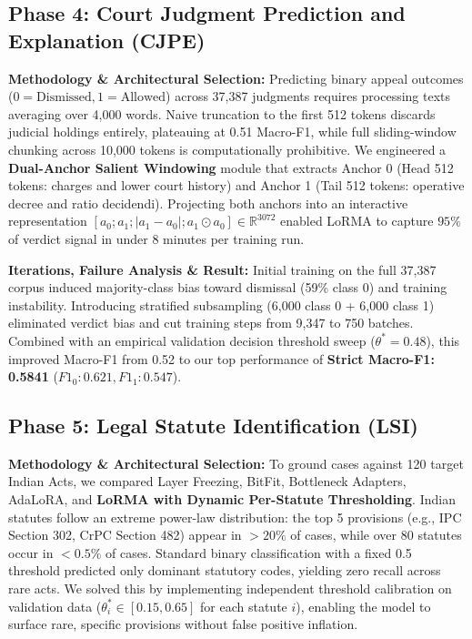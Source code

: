 \documentclass[11pt, oneside]{article}
\begin{document}
\subsection{Phase 4: Court Judgment Prediction and Explanation (CJPE)}
\noindent
\textbf{Methodology \& Architectural Selection:} Predicting binary appeal outcomes ($0 = \text{Dismissed}, 1 = \text{Allowed}$) across 37,387 judgments requires processing texts averaging over 4,000 words. Naive truncation to the first 512 tokens discards judicial holdings entirely, plateauing at 0.51 Macro-F1, while full sliding-window chunking across 10,000 tokens is computationally prohibitive. We engineered a \textbf{Dual-Anchor Salient Windowing} module that extracts Anchor 0 (Head 512 tokens: charges and lower court history) and Anchor 1 (Tail 512 tokens: operative decree and ratio decidendi). Projecting both anchors into an interactive representation $[a_0; a_1; |a_1 - a_0|; a_1 \odot a_0] \in \mathbb{R}^{3072}$ enabled LoRMA to capture $95\%$ of verdict signal in under 8 minutes per training run.

\medskip
\noindent
\textbf{Iterations, Failure Analysis \& Result:} Initial training on the full 37,387 corpus induced majority-class bias toward dismissal (59\% class 0) and training instability. Introducing stratified subsampling (6,000 class 0 + 6,000 class 1) eliminated verdict bias and cut training steps from 9,347 to 750 batches. Combined with an empirical validation decision threshold sweep ($\theta^* = 0.48$), this improved Macro-F1 from 0.52 to our top performance of \textbf{Strict Macro-F1: 0.5841} ($F1_0: 0.621, F1_1: 0.547$).

\subsection{Phase 5: Legal Statute Identification (LSI)}
\noindent
\textbf{Methodology \& Architectural Selection:} To ground cases against 120 target Indian Acts, we compared Layer Freezing, BitFit, Bottleneck Adapters, AdaLoRA, and \textbf{LoRMA with Dynamic Per-Statute Thresholding}. Indian statutes follow an extreme power-law distribution: the top 5 provisions (e.g., IPC Section 302, CrPC Section 482) appear in $>20\%$ of cases, while over 80 statutes occur in $<0.5\%$ of cases. Standard binary classification with a fixed 0.5 threshold predicted only dominant statutory codes, yielding zero recall across rare acts. We solved this by implementing independent threshold calibration on validation data ($\theta_i^* \in [0.15, 0.65]$ for each statute $i$), enabling the model to surface rare, specific provisions without false positive inflation.
\end{document}
